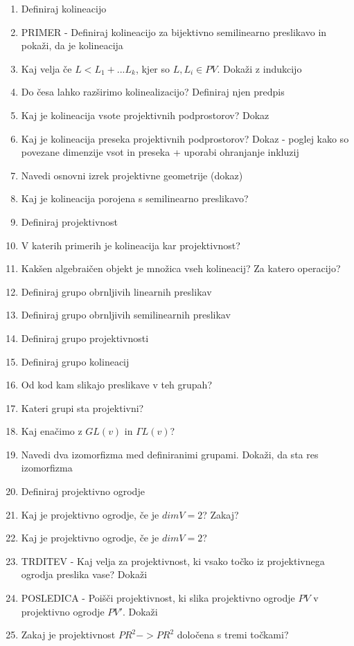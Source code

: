 \documentclass{article}
\begin{document}
    \begin{enumerate}
        \item Definiraj kolineacijo
        \item PRIMER - Definiraj kolineacijo za bijektivno semilinearno preslikavo in pokaži, da je kolineacija
        \item Kaj velja če $L < L_1 + ... L_k$, kjer so $L, L_i \in PV$. Dokaži z indukcijo
        \item Do česa lahko razširimo kolinealizacijo? Definiraj njen predpis
        \item Kaj je kolineacija vsote projektivnih podprostorov? Dokaz
        \item Kaj je kolineacija preseka projektivnih podprostorov? Dokaz - poglej kako so povezane dimenzije vsot in preseka + uporabi ohranjanje inkluzij
        \item Navedi osnovni izrek projektivne geometrije (dokaz)
        \item Kaj je kolineacija porojena s semilinearno preslikavo?
        \item Definiraj projektivnost
        \item V katerih primerih je kolineacija kar projektivnost?
        \item Kakšen algebraičen objekt je množica vseh kolineacij? Za katero operacijo?
        \item Definiraj grupo obrnljivih linearnih preslikav
        \item Definiraj grupo obrnljivih semilinearnih preslikav
        \item Definiraj grupo projektivnosti
        \item Definiraj grupo kolineacij
        \item Od kod kam slikajo preslikave v teh grupah?
        \item Kateri grupi sta projektivni?
        \item Kaj enačimo z $GL(v)$ in $\Gamma L(v)$?
        \item Navedi dva izomorfizma med definiranimi grupami. Dokaži, da sta res izomorfizma
        \item Definiraj projektivno ogrodje
        \item Kaj je projektivno ogrodje, če je $dimV = 2$? Zakaj?
        \item Kaj je projektivno ogrodje, če je $dimV = 2$? 
        \item TRDITEV - Kaj velja za projektivnost, ki vsako točko iz projektivnega ogrodja preslika vase? Dokaži
        \item POSLEDICA - Poišči projektivnost, ki slika projektivno ogrodje $PV$ v projektivno ogrodje $PV'$. Dokaži
        \item Zakaj je projektivnost $PR^2 -> PR^2$ določena s tremi točkami? 
    \end{enumerate}
\end{document}
